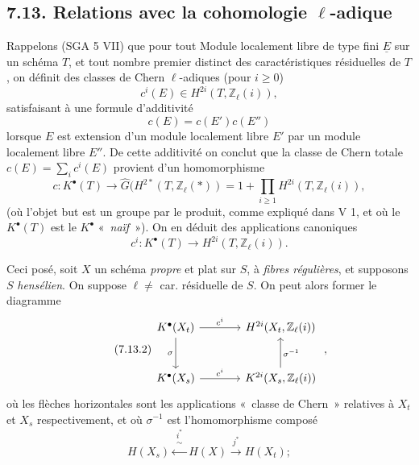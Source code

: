 
\subsection*{7.13. Relations avec la cohomologie \(\ell\)-adique}
Rappelons (SGA 5 VII) que pour tout Module localement libre de type fini \(\underline{E}\) sur un schéma \(T\), et tout nombre premier distinct des caractéristiques résiduelles de \(T\), on définit des classes de Chern \(\ell\)-adiques (pour \(i\geq 0\))
\[
  c^i(E)\in H^{2i}(T,\mathbb Z_\ell(i)),
\]
satisfaisant à une formule d'additivité
\[
  c(E)=c(E')c(E'')
\]
lorsque \(E\) est extension d'un module localement libre \(E'\) par un module localement libre \(E''\). De cette additivité on conclut que la classe de Chern totale \(c(E)=\sum_i c^i(E)\) provient d'un homomorphisme
\begin{equation}\tag{7.13.0}
  c:K^\bullet(T)\longrightarrow
  \widehat G\bigl(H^{2*}(T,\mathbb Z_\ell(*))
  =
  1+\prod_{i\geq 1}H^{2i}(T,\mathbb Z_\ell(i)),
\end{equation}
(où l'objet but est un groupe par le produit, comme expliqué dans V 1, et où le \(K^\bullet(T)\) est le \(K^\bullet\) «~\emph{naïf}~»). On en déduit des applications canoniques
\begin{equation}\tag{7.13.1}
  c^i:K^\bullet(T)\longrightarrow H^{2i}(T,\mathbb Z_\ell(i)).
\end{equation}

Ceci posé, soit \(X\) un schéma \emph{propre} et plat sur \(S\), à \emph{fibres régulières}, et supposons \(S\) \emph{hensélien}. On suppose \(\ell\neq\) car. résiduelle de \(S\). On peut alors former le diagramme
\begin{equation}\tag{7.13.2}
\begin{tikzcd}[column sep=large,row sep=large]
K^\bullet(X_t) \arrow[r,"c^i"] \arrow[d,"\sigma"'] &
H^{2i}(X_t,\mathbb Z_\ell(i))\\
K^\bullet(X_s) \arrow[r,"c^i"] &
K^{2i}(X_s,\mathbb Z_\ell(i)) \arrow[u,"\sigma^{-1}"']
\end{tikzcd}
\;,
\end{equation}
où les flèches horizontales sont les applications «~classe de Chern~» relatives à \(X_t\) et \(X_s\) respectivement, et où \(\sigma^{-1}\) est l'homomorphisme composé
\[
  H(X_s)\xleftarrow{\substack{i^*\\\sim}}H(X)\xrightarrow{j^*}H(X_t);
\]

